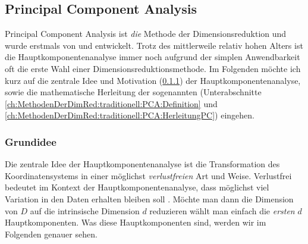 \subsection{Principal Component Analysis}
\label{ch:MethodenDerDimRed:traditionell:PCA}

Principal Component Analysis ist \textit{die} Methode der Dimensionsreduktion und wurde erstmals von \textcite{Pearson.1901} und \textcite{Hotelling.1933} entwickelt. Trotz des mittlerweile relativ hohen Alters ist die Hauptkomponentenanalyse immer noch aufgrund der simplen Anwendbarkeit oft die erste Wahl einer Dimensionsreduktionsmethode. Im Folgenden möchte ich kurz auf die zentrale Idee und Motivation (\ref{ch:MethodenDerDimRed:traditionell:PCA:Grundidee}) der Hauptkomponentenanalyse, sowie die mathematische Herleitung der sogenannten  (Unterabschnitte \ref{ch:MethodenDerDimRed:traditionell:PCA:Definition} und \ref{ch:MethodenDerDimRed:traditionell:PCA:HerleitungPC}) eingehen.


\subsubsection{Grundidee}
\label{ch:MethodenDerDimRed:traditionell:PCA:Grundidee}
Die zentrale Idee der Hauptkomponentenanalyse ist die Transformation des Koordinatensystems in einer möglichst \textit{verlustfreien} Art und Weise. Verlustfrei bedeutet im Kontext der Hauptkomponentenanalyse, dass möglichst viel Variation in den Daten erhalten bleiben soll \parencite[vgl.][1]{Jolliffe.2002}. Möchte man dann die Dimension von $D$ auf die intrinsische Dimension $d$ reduzieren wählt man einfach die \textit{ersten} $d$ Hauptkomponenten. Was diese Hauptkomponenten sind, werden wir im Folgenden genauer sehen.

